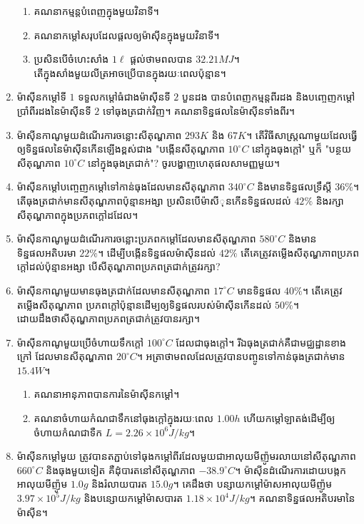 \begin{enumerate}
\begin{enumerate}
		\item គណនាកម្មន្តបំពេញក្នុងមួយវិនាទី។
		\item គណនាកម្តៅសរុបដែលផ្តលឲ្យម៉ាសុីនក្នុងមួយវិនាទី។
		\item ប្រសិនបើចំហេះសាំង $1\ell$ ផ្តល់ថាមពលបាន $32.21MJ$។\\ តើក្នុងសាំងមួយលីត្រអាចប្រើបានក្នុងរយៈពេលប៉ុន្មាន។
	\end{enumerate}
	\item ម៉ាសុីនកម្តៅទី $1$ ទទួលកម្តៅធំជាងម៉ាសុីនទី $2$ បួនដង បានបំពេញកម្មន្តពីរដង និងបញ្ចេញកម្តៅប្រាំពីរដងនៃម៉ាសុីនទី $2$ ទៅធុងត្រជាក់វិញ។ គណនាទិន្នផលនៃម៉ាសុីនទាំងពីរ។
	\item ម៉ាសុីនកាណូមួយដំណើរការចន្លោះសីតុណ្ហភាព $293K$ និង $67K$។ តើវិធីសាស្រ្តណាមួយដែលធ្វើឲ្យទិន្នផលនៃម៉ាសុីនកើនឡើងខ្ពស់ជាង "បង្កើនសីតុណ្ហភាព $10^\circ C$ នៅក្នុងធុងក្តៅ" ឬក៏ "បន្ថយសីតុណ្ហភាព $10^\circ C$ នៅក្នុងធុងត្រជាក់"? ចូរបង្ហាញហេតុផលសាមញ្ញមួយ។
	\item ម៉ាសុីនកម្តៅបញ្ចេញកម្តៅទៅកាន់ធុងដែលមានសីតុណ្ហភាព $340^\circ C$ និងមានទិន្នផលទ្រឹស្តី $36\%$។ តើធុងត្រជាក់មានសីតុណ្ហភាពប៉ុន្មានអង្សា ប្រសិនបើម៉ាសីុនកើនទិន្នផលដល់ $42\%$ និងរក្សាសីតុណ្ហភាពក្នុងប្រភពក្តៅដដែល។
	\item ម៉ាសុីនកាណូមួយដំណើរការចន្លោះប្រភពកម្តៅដែលមានសីតុណ្ហភាព $580^\circ C$ និងមានទិន្នផលអតិបរមា $22\%$។ ដើម្បីបង្កើនទិន្នផលម៉ាសុីនដល់ $42\%$ តើគេត្រូវតម្លើងសីតុណ្ហភាពប្រភពក្តៅដល់ប៉ុន្មានអង្សា បើសីតុណ្ហភាពប្រភពត្រជាក់ត្រូវរក្សា?
	\item ម៉ាសុីនកាណូមួយមានធុងត្រជាក់ដែលមានសីតុណ្ហភាព $17^\circ C$ មានទិន្នផល $40\%$។ តើគេត្រូវតម្លើងសីតុណ្ហភាព ប្រភពក្តៅប៉ុន្មានដើម្បឲ្យទិន្នផលរបស់ម៉ាសុីនកើនដល់ $50\%$។\\ ដោយដឹងថាសីតុណ្ហភាពប្រភពត្រជាក់ត្រូវបានរក្សា។
	\item ម៉ាសុីនកាណូមួយប្រើចំហាយទឹកក្តៅ $100^\circ C$ ដែលជាធុងក្តៅ។ រីឯធុងត្រជាក់គឺជាមជ្ឈដ្ឋានខាងក្រៅ ដែលមានសីតុណ្ហភាព $20^\circ C$។ អត្រាថាមពលដែលត្រូវបានបញ្ចូនទៅកាន់ធុងត្រជាក់មាន $15.4W$។
	\begin{enumerate}
		\item គណនាអានុភាពបានការនៃម៉ាសុីនកម្តៅ។
		\item គណនាចំហាយកំណជាទឹកនៅធុងក្តៅក្នុងរយៈពេល $1.00h$ ហើយកម្តៅឡាតង់ដើម្បីឲ្យចំហាយកំណជាទឺក $L=2.26\times10^{6}J/kg$។
	\end{enumerate}
	\item ម៉ាសុីនកម្តៅមួយ ត្រូវបានតភ្ជាប់ទៅធុងកម្តៅពីរដែលមួយជាអាលុយមីញ៉ូមរលាយនៅសីតុណ្ហភាព $660^\circ C$ និងធុងមួយទៀត គឺដុំបារតនៅសីតុណ្ហភាព $-38.9^\circ C$។ ម៉ាសុីនដំណើរការដោយបង្កកអាលុយមីញ៉ូម $1.0g$ និងរំលាយបារត $15.0g$។ គេដឹងថា បន្សាយកម្តៅម៉ាសអាលុយមីញ៉ូម $3.97\times10^{5}J/kg$ និងបន្សោយកម្តៅម៉ាសបារត $1.18\times10^{4}J/kg$។ គណនាទិន្នផលអតិបរមានៃម៉ាសុីន។

\end{enumerate}
